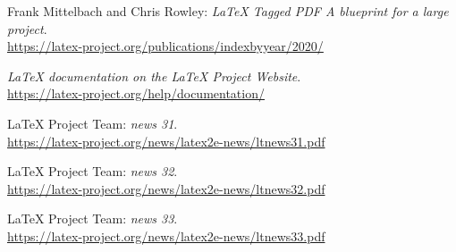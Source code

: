 \documentclass{ltnews}
\providecommand\Dash {\unskip \textemdash}
\begin{document}
\begin{thebibliography}{9}

\fontsize{9.3}{11.3}\selectfont

 Frank Mittelbach and Chris Rowley:
  \emph{\LaTeX{} Tagged PDF \Dash A blueprint for a large project}.\\
  \url{https://latex-project.org/publications/indexbyyear/2020/}

  \emph{\LaTeX{} documentation on the \LaTeX{} Project Website}.\\
  \url{https://latex-project.org/help/documentation/}

 \LaTeX{} Project Team:
  \emph{\LaTeXe{} news 31}.\\
  \url{https://latex-project.org/news/latex2e-news/ltnews31.pdf}

 \LaTeX{} Project Team:
  \emph{\LaTeXe{} news 32}.\\
  \url{https://latex-project.org/news/latex2e-news/ltnews32.pdf}

 \LaTeX{} Project Team:
  \emph{\LaTeXe{} news 33}.\\
  \url{https://latex-project.org/news/latex2e-news/ltnews33.pdf}

\end{thebibliography}
\end{document}
